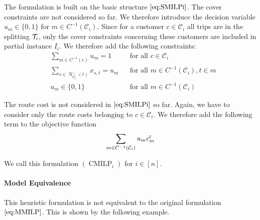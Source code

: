 The formulation is built on the basic structure $\eqref{eq:SMILPi}$. The cover constraints are not considered so far. We therefore introduce the decision variable $u_m\in\{0,1\}$ for $m\in C^{-1}\left(\mathcal{C}_i\right)$. Since for a customer $c\in\mathcal{C}_i$ all trips are in the splitting $\mathcal{T}_i$, only the cover constraints concerning these customers are included in partial instance $I_i$. We therefore add the following constraints:
\begin{align}
	& \sum_{m\in C^{-1}(c)} u_m = 1 && \text{for all } c\in\mathcal{C}_i \label{eq:CMILP:customer} \\
	& \sum_{s\in\operatorname{N}_{\overline{G}_i}^-(t)} x_{s,t} = u_m && \text{for all } m\in C^{-1}\left(\mathcal{C}_i\right), t\in m \label{eq:CMILP:route} \\
	& u_m\in\{0,1\} && \text{for all } m\in C^{-1}\left(\mathcal{C}_i\right) \label{eq:CMILP:um}
\end{align}

The route cost is not considered in $\eqref{eq:SMILPi}$ so far. Again, we have to consider only the route costs belonging to $c\in\mathcal{C}_i$. We therefore add the following term to the objective function
\begin{align*}
	\sum_{m\in C^{-1}\left(\mathcal{C}_i\right)} u_m c^{\operatorname{r}}_m
\end{align*}

We call this formulation $(\operatorname{CMILP}_i)$ for $i\in[n]$.

\paragraph{Model Equivalence} \parfill

This heuristic formulation is not equivalent to the original formulation $\eqref{eq:MMILP}$. This is shown by the following example.

